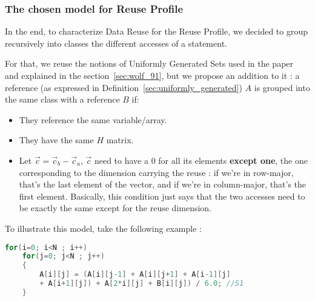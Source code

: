 \documentclass[paper=a4, fontsize=11.5pt]{scrartcl}
\numberwithin{equation}{section}        %
\numberwithin{figure}{section}          %
\numberwithin{table}{section}               %
\begin{document}

        \subsubsection{The chosen model for Reuse Profile}
            In the end, to characterize Data Reuse for the Reuse Profile, we decided to
            group recursively into classes the different accesses of a statement.

            For that, we reuse the notions of Uniformly Generated Sets used in the paper~\cite{Wolf'91}
            and explained in the section~\ref{sec:wolf_91}, but we propose an addition to it :
            a reference (as expressed in Definition~\ref{sec:uniformly_generated}) $A$ is 
            grouped into the same class with a reference $B$ if:
            \begin{itemize}
                \item They reference the same variable/array.
                \item They have the same $H$ matrix.
                \item Let $\vec{c}=\vec{c}_b - \vec{c}_a$, $\vec{c}$ need to have a $0$
                    for all its elements \textbf{except one}, the one corresponding
                    to the dimension carrying the reuse : if we're in row-major, that's the
                    last element of the vector, and if we're in column-major, that's the first
                    element. Basically, this condition just says that the two accesses need
                    to be exactly the same except for the reuse dimension.
            \end{itemize}

            \bigskip

            To illustrate this model, take the following example :

\begin{lstlisting}[frame=single, language=C, caption=Reuse Profiling example, label={lst:rp_example_0}]
for(i=0; i<N ; i++)
    for(j=0; j<N ; j++)
    {
        A[i][j] = (A[i][j-1] + A[i][j+1] + A[i-1][j]
        + A[i+1][j]) + A[2*i][j] + B[i][j]) / 6.0; //S1
    }
\end{lstlisting}
\end{document}
